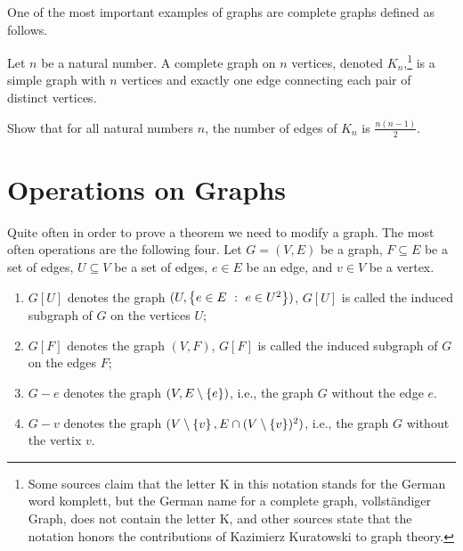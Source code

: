 One of the most important examples of graphs are complete graphs defined as
follows.
\begin{definition}
  Let $n$ be a natural number. A complete graph on $n$ vertices, denoted
  $K_n$,\footnote[][-2cm]{%
    Some sources claim that the letter K in this notation stands for the German
    word komplett, but the German name for a complete graph, vollst\"{a}ndiger
    Graph, does not contain the letter K, and other sources state that the
    notation honors the contributions of Kazimierz Kuratowski to graph theory.
  } is a simple graph with $n$ vertices and exactly one edge connecting
  each pair of distinct vertices.
\end{definition}

\begin{exercise}
  Show that for all natural numbers $n$, the number of edges of $K_n$
  is $\frac{n(n - 1)}{2}$.
\end{exercise}

\section{Operations on Graphs}
Quite often in order to prove a theorem we need to modify a graph. The most
often operations are the following four. Let $G = (V, E)$ be a graph,
$F \subseteq E$ be a set of edges, $U \subseteq V$ be a set of edges,
$e \in E$ be an edge, and $v \in V$ be a vertex.
\begin{enumerate}
  \item $G[U]$ denotes the graph $(U, \set[e \in U^2]{e \in E})$,
    $G[U]$ is called the induced subgraph of $G$ on the vertices $U$;
  \item $G[F]$ denotes the graph $(V, F)$, $G[F]$ is called the induced
    subgraph of $G$ on the edges $F$;
  \item $G - e$ denotes the graph $(V, E \setminus \set{e})$, i.e., the graph $G$
    without the edge $e$.
  \item $G - v$ denotes the graph
    $(V \setminus \set{v}, E \cap (V \setminus \set{v})^2)$, i.e., the graph $G$
    without the vertix $v$.
\end{enumerate}

